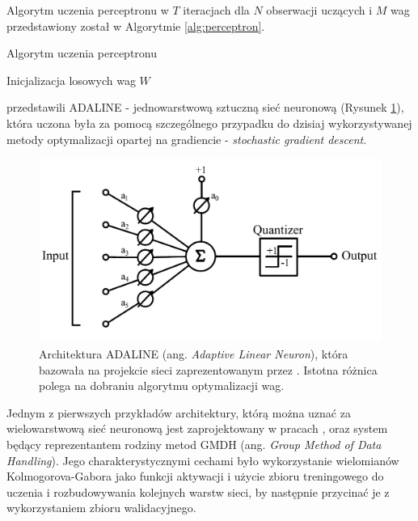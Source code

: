 \documentclass[12pt,a4paper,twoside]{article}
\begin{document}
Algorytm uczenia perceptronu w $T$ iteracjach dla $N$ obserwacji uczących i $M$ wag przedstawiony został w Algorytmie \ref{alg:perceptron}.

\begin{algorithm}
\caption{Algorytm uczenia perceptronu}\label{alg:perceptron}
  \begin{algorithmic}[1]
    \State Inicjalizacja losowych wag $W$
        \EndFor
      \EndFor
    \EndFor
  \end{algorithmic}
\end{algorithm}

\citet{widrow1960} przedstawili ADALINE - jednowarstwową sztuczną sieć neuronową (Rysunek \ref{fig:ADALINE}), która uczona była za pomocą szczególnego przypadku do dzisiaj wykorzystywanej metody optymalizacji opartej na gradiencie - \textit{stochastic gradient descent}.

\begin{figure}[h]
  \centering
\includegraphics[scale=0.5]{../obrazy/fig:ADALINE.png}
\caption{Architektura ADALINE (ang. \textit{Adaptive Linear Neuron}), która bazowała na projekcie sieci zaprezentowanym przez \citet{mcculloch1943}. Istotna różnica polega na dobraniu algorytmu optymalizacji wag. \label{fig:ADALINE}}
\end{figure}

Jednym z pierwszych przykładów architektury, którą można uznać za wielowarstwową sieć neuronową jest zaprojektowany w pracach \citet{ivakhnenko1965}, \citet{ivakhnenko1967} oraz \citet{ivakhnenko1968} system będący reprezentantem rodziny metod GMDH (ang. \textit{Group Method of Data Handling}). Jego charakterystycznymi cechami było wykorzystanie wielomianów Kolmogorova-Gabora jako funkcji aktywacji i użycie zbioru treningowego do uczenia i rozbudowywania kolejnych warstw sieci, by następnie przycinać je z wykorzystaniem zbioru walidacyjnego.
\end{document}
